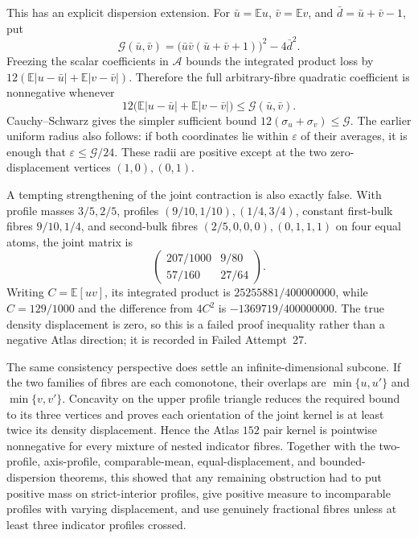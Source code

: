 \documentclass[11pt]{article}
\begin{document}
This has an explicit dispersion extension.  For
$\bar u=\mathbb E u$, $\bar v=\mathbb E v$, and
$\bar d=\bar u+\bar v-1$, put
\[
 \mathcal G(\bar u,\bar v)
 =\bigl(\bar u\bar v(\bar u+\bar v+1)\bigr)^2-4\bar d^2.
\]
Freezing the scalar coefficients in $\mathcal A$ bounds the integrated
product loss by
$12(\mathbb E|u-\bar u|+\mathbb E|v-\bar v|)$.  Therefore the full
arbitrary-fibre quadratic coefficient is nonnegative whenever
\[
 12\bigl(\mathbb E|u-\bar u|+\mathbb E|v-\bar v|\bigr)
 \leq\mathcal G(\bar u,\bar v).
\]
Cauchy--Schwarz gives the simpler sufficient bound
$12(\sigma_u+\sigma_v)\leq\mathcal G$.  The earlier uniform radius also
follows: if both coordinates lie within $\varepsilon$ of their averages, it
is enough that $\varepsilon\leq\mathcal G/24$.  These radii are positive
except at the two zero-displacement vertices $(1,0),(0,1)$.

A tempting strengthening of the joint contraction is also exactly false.
With profile masses $3/5,2/5$, profiles $(9/10,1/10),(1/4,3/4)$, constant
first-bulk fibres $9/10,1/4$, and second-bulk fibres
$(2/5,0,0,0),(0,1,1,1)$ on four equal atoms, the joint matrix is
\[
 \begin{pmatrix}207/1000&9/80\\57/160&27/64\end{pmatrix}.
\]
Writing $C=\mathbb E[uv]$, its integrated product is
$25255881/400000000$, while $C=129/1000$ and the difference from $4C^2$ is
$-1369719/400000000$.  The true density displacement is zero, so this is a
failed proof inequality rather than a negative Atlas direction; it is
recorded in Failed Attempt~27.

The same consistency perspective does settle an infinite-dimensional
subcone.  If the two families of fibres are each comonotone, their overlaps
are $\min\{u,u'\}$ and $\min\{v,v'\}$.  Concavity on the upper profile
triangle reduces the required bound to its three vertices and proves each
orientation of the joint kernel is at least twice its density displacement.
Hence the Atlas $152$ pair kernel is pointwise nonnegative for every mixture
of nested indicator fibres.  Together with the two-profile, axis-profile,
comparable-mean, equal-displacement, and bounded-dispersion theorems, this
showed that any remaining obstruction had to put positive mass on
strict-interior profiles, give positive measure to incomparable profiles
with varying displacement, and use genuinely fractional fibres unless at
least three indicator profiles crossed.
\end{document}
